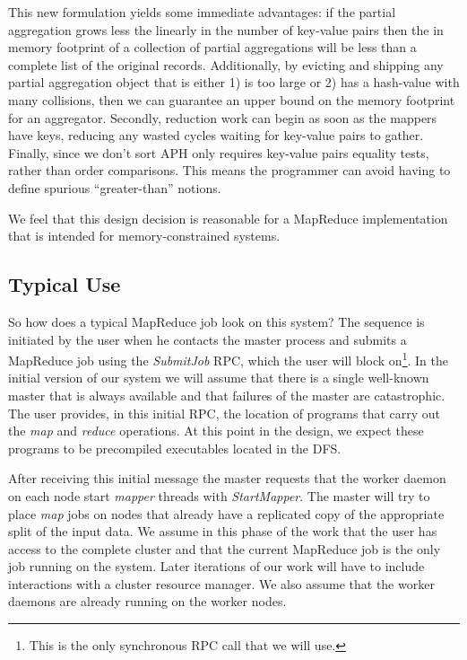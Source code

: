\documentclass[10pt,letter,final,article,twocolumn]{article} %
\newcommand{\rpc}[1]{\emph{#1}}
\begin{document}
This new formulation yields some immediate advantages: if the partial aggregation grows less the linearly in the number of key-value pairs then the in memory footprint of a collection of partial aggregations will be less than a complete list of the original records. Additionally, by evicting and shipping any partial aggregation object that is either 1) is too large or 2) has a hash-value with many collisions, then we can guarantee an upper bound on the memory footprint for an aggregator. Secondly, reduction work can begin as soon as the mappers have keys, reducing any wasted cycles waiting for key-value pairs to gather. Finally, since we don't sort APH only requires key-value pairs equality tests, rather than order comparisons. This means the programmer can avoid having to define spurious ``greater-than'' notions.


We feel that this design decision is reasonable for a MapReduce implementation that is intended for memory-constrained systems.

\subsection{Typical Use}

So how does a typical MapReduce job look on this system? The sequence is initiated by the user when he contacts the master process and submits a MapReduce job using the \rpc{SubmitJob} RPC, which the user will block on\footnote{This is the only synchronous RPC call  that we will use.}. In the initial version of our system we will assume that there is a single well-known master that is always available and that failures of the master are catastrophic. The user provides, in this initial RPC, the location of programs that carry out the \emph{map} and \emph{reduce} operations. At this point in the design, we expect these programs to be precompiled executables located in the DFS.

After receiving this initial message the master requests that the worker daemon on each node start \emph{mapper} threads with \rpc{StartMapper}. The master will try to place \emph{map} jobs on nodes that already have a replicated copy of the appropriate split of the input data.  We assume in this phase of the work that the user has access to the complete cluster and that the current MapReduce job is the only job running on the system. Later iterations of our work will have to include interactions with a cluster resource manager. We also assume that the worker daemons are already running on the worker nodes.
\end{document}
